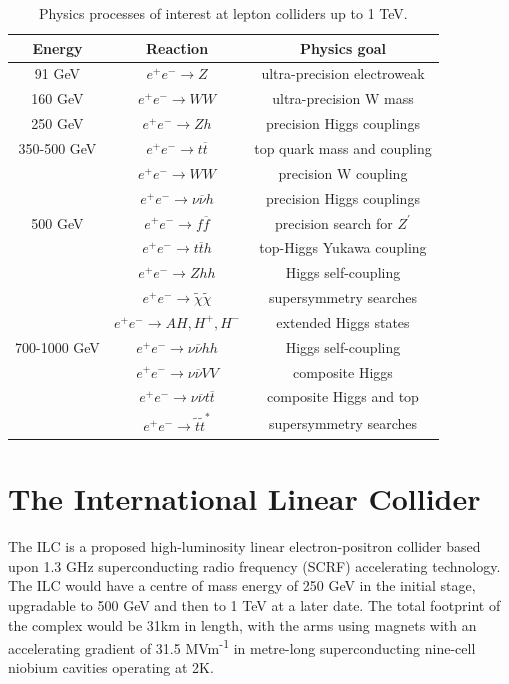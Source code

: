 \begin{table}[b]
\centering
	\begin{tabular}{ c | c | c }
	\hline \hline
	\textbf{Energy} & \textbf{Reaction} & \textbf{Physics goal} \\ \hline
	 91 GeV & $e^+ e^- \rightarrow Z$ & ultra-precision electroweak \\ \hline
	 160 GeV & $e^+ e^- \rightarrow WW$ & ultra-precision W mass \\ \hline
	 250 GeV & $e^+ e^- \rightarrow Zh$ & precision Higgs couplings \\ \hline
	 350-500 GeV & $e^+ e^- \rightarrow t\overline{t}$ & top quark mass and coupling \\
	   & $e^+ e^- \rightarrow WW$ & precision W coupling \\
	   & $e^+ e^- \rightarrow \nu \overline{\nu} h$ & precision Higgs couplings \\ \hline
	 500 GeV & $e^+ e^- \rightarrow f \overline{f}$ & precision search for $Z^\prime$ \\
	   & $e^+ e^- \rightarrow t \overline{t}h$ & top-Higgs Yukawa coupling \\
	   & $e^+ e^- \rightarrow Zhh$ & Higgs self-coupling \\
	   & $e^+ e^- \rightarrow \widetilde{\chi} \widetilde{\chi}$ & supersymmetry searches \\
	   & $e^+ e^- \rightarrow AH, H^+, H^-$ & extended Higgs states \\ \hline
	 700-1000 GeV & $e^+ e^- \rightarrow \nu \overline{\nu} hh$ & Higgs self-coupling \\
	   & $e^+ e^- \rightarrow \nu \overline{\nu} VV$ & composite Higgs \\
	   & $e^+ e^- \rightarrow  \nu \overline{\nu} t \overline{t}$ & composite Higgs and top \\
	   & $e^+ e^- \rightarrow \tilde{t} \tilde{t}^*$ & supersymmetry searches \\ \hline
	\end{tabular}
	\caption{Physics processes of interest at lepton colliders up to 1 TeV.}
	\label{table:colliders/physics-goals}
\end{table}

\section{The International Linear Collider}
The \acrfull{ILC} is a proposed high-luminosity linear electron-positron collider based upon 1.3 GHz superconducting radio frequency (\acrshort{SCRF}) accelerating technology. The ILC would have a centre of mass energy of 250 GeV in the initial stage, upgradable to 500 GeV and then to 1 TeV at a later date. The total footprint of the complex would be 31km in length, with the arms using magnets with an accelerating gradient of 31.5 MVm\textsuperscript{-1} in metre-long superconducting nine-cell niobium cavities operating at 2K.

